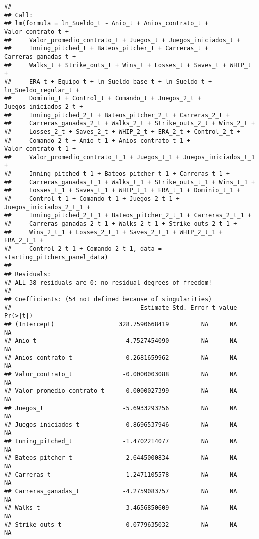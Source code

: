 \documentclass[
]{article}
\begin{document}
\begin{verbatim}
## 
## Call:
## lm(formula = ln_Sueldo_t ~ Anio_t + Anios_contrato_t + Valor_contrato_t + 
##     Valor_promedio_contrato_t + Juegos_t + Juegos_iniciados_t + 
##     Inning_pitched_t + Bateos_pitcher_t + Carreras_t + Carreras_ganadas_t + 
##     Walks_t + Strike_outs_t + Wins_t + Losses_t + Saves_t + WHIP_t + 
##     ERA_t + Equipo_t + ln_Sueldo_base_t + ln_Sueldo_t + ln_Sueldo_regular_t + 
##     Dominio_t + Control_t + Comando_t + Juegos_2_t + Juegos_iniciados_2_t + 
##     Inning_pitched_2_t + Bateos_pitcher_2_t + Carreras_2_t + 
##     Carreras_ganadas_2_t + Walks_2_t + Strike_outs_2_t + Wins_2_t + 
##     Losses_2_t + Saves_2_t + WHIP_2_t + ERA_2_t + Control_2_t + 
##     Comando_2_t + Anio_t_1 + Anios_contrato_t_1 + Valor_contrato_t_1 + 
##     Valor_promedio_contrato_t_1 + Juegos_t_1 + Juegos_iniciados_t_1 + 
##     Inning_pitched_t_1 + Bateos_pitcher_t_1 + Carreras_t_1 + 
##     Carreras_ganadas_t_1 + Walks_t_1 + Strike_outs_t_1 + Wins_t_1 + 
##     Losses_t_1 + Saves_t_1 + WHIP_t_1 + ERA_t_1 + Dominio_t_1 + 
##     Control_t_1 + Comando_t_1 + Juegos_2_t_1 + Juegos_iniciados_2_t_1 + 
##     Inning_pitched_2_t_1 + Bateos_pitcher_2_t_1 + Carreras_2_t_1 + 
##     Carreras_ganadas_2_t_1 + Walks_2_t_1 + Strike_outs_2_t_1 + 
##     Wins_2_t_1 + Losses_2_t_1 + Saves_2_t_1 + WHIP_2_t_1 + ERA_2_t_1 + 
##     Control_2_t_1 + Comando_2_t_1, data = starting_pitchers_panel_data)
## 
## Residuals:
## ALL 38 residuals are 0: no residual degrees of freedom!
## 
## Coefficients: (54 not defined because of singularities)
##                                    Estimate Std. Error t value Pr(>|t|)
## (Intercept)                  328.7590668419         NA      NA       NA
## Anio_t                         4.7527454090         NA      NA       NA
## Anios_contrato_t               0.2681659962         NA      NA       NA
## Valor_contrato_t              -0.0000003088         NA      NA       NA
## Valor_promedio_contrato_t     -0.0000027399         NA      NA       NA
## Juegos_t                      -5.6933293256         NA      NA       NA
## Juegos_iniciados_t            -0.8696537946         NA      NA       NA
## Inning_pitched_t              -1.4702214077         NA      NA       NA
## Bateos_pitcher_t               2.6445000834         NA      NA       NA
## Carreras_t                     1.2471105578         NA      NA       NA
## Carreras_ganadas_t            -4.2759083757         NA      NA       NA
## Walks_t                        3.4656850609         NA      NA       NA
## Strike_outs_t                 -0.0779635032         NA      NA       NA

\end{verbatim}
\end{document}
